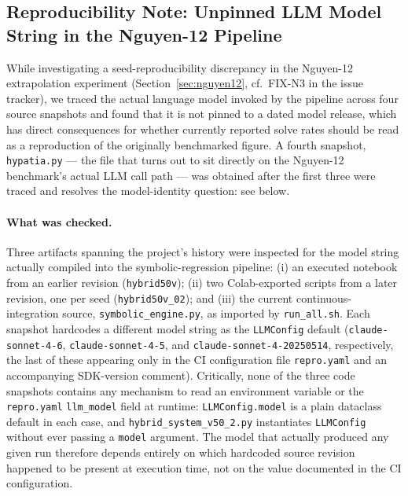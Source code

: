 
\subsection{Reproducibility Note: Unpinned LLM Model String in the Nguyen-12 Pipeline}
\label{sec:repro-note-model-drift}

While investigating a seed-reproducibility discrepancy in the Nguyen-12
extrapolation experiment (Section~\ref{sec:nguyen12}, cf.\ FIX-N3 in the
issue tracker), we traced the actual language model invoked by the pipeline
across four source snapshots and found that it is not pinned to a dated
model release, which has direct consequences for whether currently reported
solve rates should be read as a reproduction of the originally benchmarked
figure. A fourth snapshot, \texttt{hypatia.py} — the file that turns out to
sit directly on the Nguyen-12 benchmark's actual LLM call path — was
obtained after the first three were traced and resolves the model-identity
question: see below.

\paragraph{What was checked.} Three artifacts spanning the project's
history were inspected for the model string actually compiled into the
symbolic-regression pipeline: (i) an executed notebook from an earlier
revision (\texttt{hybrid50v}); (ii) two Colab-exported scripts from a later
revision, one per seed (\texttt{hybrid50v\_02}); and (iii) the current
continuous-integration source, \texttt{symbolic\_engine.py}, as imported by
\texttt{run\_all.sh}. Each snapshot hardcodes a different model string as
the \texttt{LLMConfig} default (\texttt{claude-sonnet-4-6},
\texttt{claude-sonnet-4-5}, and \texttt{claude-sonnet-4-20250514},
respectively, the last of these appearing only in the CI configuration file
\texttt{repro.yaml} and an accompanying SDK-version comment). Critically,
none of the three code snapshots contains any mechanism to read an
environment variable or the \texttt{repro.yaml} \texttt{llm\_model} field at
runtime: \texttt{LLMConfig.model} is a plain dataclass default in each case,
and \texttt{hybrid\_system\_v50\_2.py} instantiates \texttt{LLMConfig}
without ever passing a \texttt{model} argument. The model that actually
produced any given run therefore depends entirely on which hardcoded source
revision happened to be present at execution time, not on the value
documented in the CI configuration.

